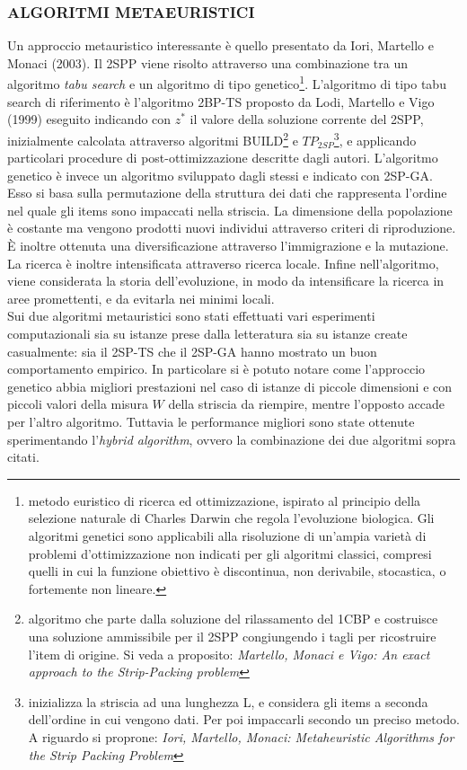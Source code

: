 \documentclass[12pt,a4paper,openright,twoside]{report}
\begin{document}
\subsubsection{ALGORITMI METAEURISTICI}
Un approccio metauristico interessante \`{e} quello presentato da Iori, Martello e Monaci (2003). Il 2SPP viene risolto attraverso una combinazione tra un algoritmo \textit{tabu search} e un algoritmo di tipo genetico\footnote{metodo euristico di ricerca ed ottimizzazione, ispirato al principio della selezione naturale di Charles Darwin che regola l'evoluzione biologica. Gli algoritmi genetici sono applicabili alla risoluzione di un'ampia variet\`{a} di problemi d'ottimizzazione non indicati per gli algoritmi classici, compresi quelli in cui la funzione obiettivo \`{e} discontinua, non derivabile, stocastica, o fortemente non lineare.}. L'algoritmo di tipo tabu search di riferimento \`{e} l'algoritmo 2BP-TS proposto da Lodi, Martello e Vigo (1999) eseguito indicando con $z^{*}$ il valore della soluzione corrente del 2SPP, inizialmente calcolata attraverso algoritmi BUILD\footnote{algoritmo che parte dalla soluzione del rilassamento del 1CBP e costruisce una
soluzione ammissibile per il 2SPP congiungendo i tagli per ricostruire l'item di origine. Si veda a proposito: \textit{Martello, Monaci e Vigo: An exact approach to the Strip-Packing problem}} e $TP_{2SP}$\footnote{inizializza la striscia ad una lunghezza L, e considera gli items a seconda dell'ordine in cui vengono dati. Per poi impaccarli secondo un preciso metodo. A riguardo si proprone: \textit{Iori, Martello, Monaci: Metaheuristic Algorithms for the Strip Packing Problem}}, e applicando particolari procedure di post-ottimizzazione descritte dagli autori. L'algoritmo genetico \`{e} invece un algoritmo sviluppato dagli stessi e indicato con 2SP-GA. Esso si basa sulla permutazione della struttura dei dati che rappresenta l'ordine nel quale gli items sono impaccati nella striscia. La dimensione della popolazione \`{e} costante ma vengono prodotti nuovi individui attraverso criteri di riproduzione. \`{E} inoltre ottenuta una diversificazione attraverso l'immigrazione e la mutazione. La ricerca \`{e} inoltre intensificata attraverso ricerca locale. Infine nell'algoritmo, viene considerata la storia dell'evoluzione, in modo da intensificare la ricerca in aree promettenti, e da evitarla nei minimi locali.\\
Sui due algoritmi metauristici sono stati effettuati vari esperimenti computazionali sia su istanze prese dalla letteratura sia su istanze create casualmente: sia il 2SP-TS che il 2SP-GA hanno mostrato un buon comportamento empirico. In particolare si \`{e} potuto notare come l'approccio genetico abbia migliori prestazioni nel caso di istanze di piccole dimensioni e con piccoli valori della misura $W$ della striscia da riempire, mentre l'opposto accade per l'altro algoritmo. Tuttavia le performance migliori sono state ottenute sperimentando l'\textit{hybrid algorithm}, ovvero la combinazione dei due algoritmi sopra citati.\\
\end{document}

